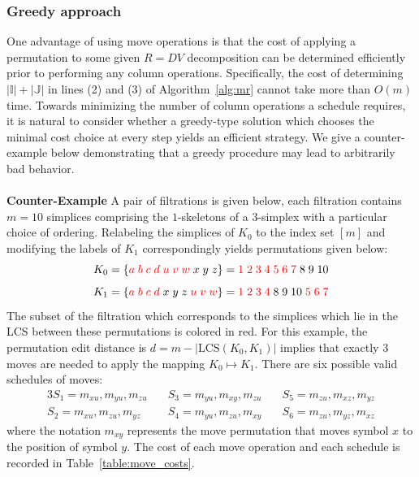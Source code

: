 \documentclass{siamart190516}
\begin{document}
\subsubsection{Greedy approach}\label{sec:greedy} 
One advantage of using move operations is that the cost of applying a permutation to some given $R = D V$ decomposition can be determined efficiently prior to performing any column operations. 
Specifically, the cost of determining $\lvert \mathbb{I}\rvert + \lvert \mathbb{J}\rvert$ in lines (2) and (3) of Algorithm~\ref{alg:mr} cannot take more than $O(m)$ time. 
Towards minimizing the number of column operations a schedule requires, it is natural to consider whether a greedy-type solution which chooses the minimal cost choice at every step yields an efficient strategy. We give a counter-example below demonstrating that a greedy procedure may lead to arbitrarily bad behavior. 
\\
\\
\textbf{Counter-Example} A pair of filtrations is given below, each filtration contains $m = 10$ simplices comprising the $1$-skeletons of a $3$-simplex with a particular choice of ordering. Relabeling the simplices of $K_0$ to the index set $[m]$ and modifying the labels of $K_1$ correspondingly yields permutations given below: 
$$ K_0 = \{ {\color{red} a \; b \; c \; d \; u \; v \; w} \; x \; y \; z  \} = { {\color{red} 1 \; 2 \; 3 \; 4 \; 5 \; 6 \; 7 } \; 8 \; 9 \; 10 } $$
$$ K_1 = \{ {\color{red} a \; b \; c \; d } \; x \; y \; z \; {\color{red} u \; v \; w } \}  = { {\color{red} 1 \; 2 \; 3 \; 4 } \;8 \; 9 \; 10 \; {\color{red} 5 \; 6 \; 7 } }$$
The subset of the filtration which corresponds to the simplices which lie in the LCS between these permutations is colored in red. For this example, the permutation edit distance is 
$d = m - |\mathrm{LCS}(K_0, K_1)|$ implies that exactly $3$ moves are needed to apply the mapping $K_0 \mapsto K_1$. There are six possible valid schedules of moves: 
\begin{alignat*}{3}
	S_1 = m_{x u}, m_{y u}, m_{z u} \quad & S_3 = m_{y u}, m_{x y}, m_{z u} \quad  & S_5 = m_{z u}, m_{x z}, m_{y z} \\
	S_2 = m_{x u}, m_{z u}, m_{y z} \quad  & S_4 = m_{y u}, m_{z u}, m_{x y} \quad  & S_6 = m_{z u}, m_{y z}, m_{x z} 
\end{alignat*}
where the notation $m_{x y}$ represents the move permutation that moves symbol $x$ to the position of symbol $y$. The cost of each  move operation and each schedule is recorded in Table~\ref{table:move_costs}.
\end{document}
